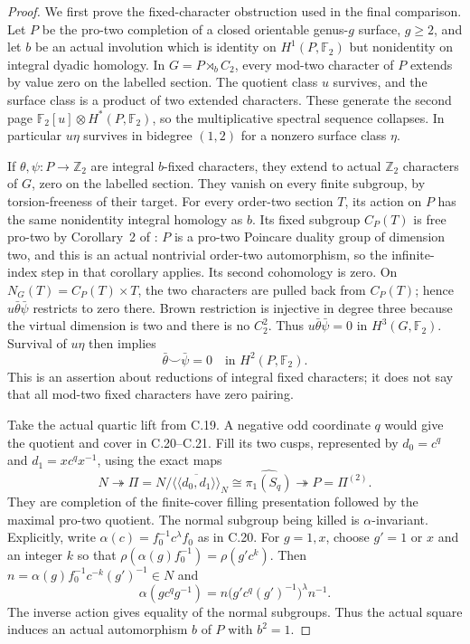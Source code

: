 \begin{proof}
We first prove the fixed-character obstruction used
in the final comparison.  Let $P$ be the pro-two
completion of a closed orientable genus-$g$ surface,
$g\geq2$, and let $b$ be an actual involution which
is identity on $H^1(P,\mathbb F_2)$ but nonidentity
on integral dyadic homology.  In
$G=P\rtimes_b C_2$, every mod-two character of $P$
extends by value zero on the labelled section.
The quotient class $u$ survives, and the surface
class is a product of two extended characters.
These generate the second page
$\mathbb F_2[u]\otimes H^*(P,\mathbb F_2)$, so the
multiplicative spectral sequence collapses.  In
particular $u\eta$ survives in bidegree $(1,2)$
for a nonzero surface class $\eta$.

If $\theta,\psi:P\to\mathbb Z_2$ are integral
$b$-fixed characters, they extend to actual
$\mathbb Z_2$ characters of $G$, zero on the
labelled section.  They vanish on every finite
subgroup, by torsion-freeness of their target.
For every order-two section $T$, its action on
$P$ has the same nonidentity integral homology
as $b$.  Its fixed subgroup $C_P(T)$ is free
pro-two by Corollary~2 of
\cite{CEKochloukovaZalesskii2007}: $P$ is a
pro-two Poincare duality group of dimension two,
and this is an actual nontrivial order-two
automorphism, so the infinite-index step in that
corollary applies.  Its second cohomology is zero.
On $N_G(T)=C_P(T)\times T$, the two characters
are pulled back from $C_P(T)$; hence
$u\bar\theta\bar\psi$ restricts to zero there.
Brown restriction is injective in degree three
because the virtual dimension is two and there
is no $C_2^2$.  Thus $u\bar\theta\bar\psi=0$
in $H^3(G,\mathbb F_2)$.  Survival of $u\eta$
then implies
\[
 \bar\theta\smile\bar\psi=0
                 \quad\text{in }H^2(P,\mathbb F_2).        \tag{C.22.1}
\]
This is an assertion about reductions of integral
fixed characters; it does not say that all
mod-two fixed characters have zero pairing.

Take the actual quartic lift from C.19.  A negative
odd coordinate $q$ would give the quotient and
cover in C.20--C.21.  Fill its two cusps, represented
by $d_0=c^q$ and $d_1=xc^qx^{-1}$, using the exact
maps
\[
 N\twoheadrightarrow
 \Pi=N/\overline{\langle\!\langle d_0,d_1\rangle\!\rangle}_N
       \cong\widehat{\pi_1(S_q)}
       \twoheadrightarrow P=\Pi^{(2)}.                    \tag{C.22.2}
\]
They are completion of the finite-cover filling
presentation followed by the maximal pro-two
quotient.  The normal subgroup being killed is
$\alpha$-invariant.  Explicitly, write
$\alpha(c)=f_0^{-1}c^\lambda f_0$ as in C.20.
For $g=1,x$, choose $g'=1$ or $x$ and an integer
$k$ so that
$\rho(\alpha(g)f_0^{-1})=\rho(g'c^k)$.
Then $n=\alpha(g)f_0^{-1}c^{-k}(g')^{-1}\in N$
and
\[
 \alpha(gc^qg^{-1})
       =n\bigl(g'c^q(g')^{-1}\bigr)^\lambda n^{-1}.
\]
The inverse action gives equality of the normal
subgroups.  Thus the actual square induces an
actual automorphism $b$ of $P$ with $b^2=1$.


\end{proof}
